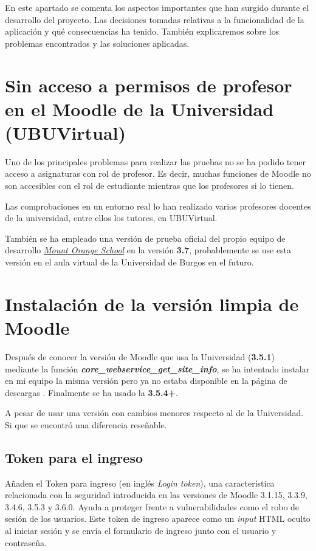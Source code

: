 
En este apartado se comenta los aspectos importantes que han surgido durante el desarrollo del proyecto. Las decisiones tomadas relativas a la funcionalidad de la aplicación y qué consecuencias ha tenido. También explicaremos sobre los problemas encontrados y las soluciones aplicadas.

\section{Sin acceso a permisos de profesor en el Moodle de la Universidad (UBUVirtual)}

Uno de los principales problemas para realizar las pruebas no se ha podido tener acceso a asignaturas con rol de profesor. Es decir, muchas funciones de Moodle no son accesibles con el rol de estudiante mientras que los profesores si lo tienen.

Las comprobaciones en un entorno real lo han realizado varios profesores docentes de la universidad, entre ellos los tutores, en UBUVirtual.

También se ha empleado una versión de prueba oficial del propio equipo de desarrollo \href{https://school.demo.moodle.net}{\textit{Mount Orange School}} en la versión \textbf{3.7}, probablemente se use esta versión en el aula virtual de la Universidad de Burgos en el futuro.

\section{Instalación de la versión limpia de Moodle}
Después de conocer la versión de Moodle que usa la Universidad (\textbf{3.5.1}) mediante  la función \textbf{\textit{core\_webservice\_get\_site\_info}}, se ha intentado instalar en mi equipo la misma versión pero ya no estaba disponible en la página de descargas \cite{noauthor_moodle_nodate}. Finalmente se ha usado la \textbf{3.5.4+}.

A pesar de usar una versión con cambios menores respecto al de la Universidad. Si que se encontró una diferencia reseñable. 

\subsection{Token para el ingreso}
Añaden el Token para ingreso\cite{noauthor_token_nodate} (en inglés \textit{Login token}), una característica relacionada con la seguridad introducida en las versiones de Moodle 3.1.15, 3.3.9, 3.4.6, 3.5.3 y 3.6.0. Ayuda a proteger frente a vulnerabilidades como el robo de sesión de los usuarios. Este token de ingreso aparece como un \textit{input} HTML oculto\cite{noauthor_html_nodate-1} al iniciar sesión y se envía el formulario de ingreso junto con el usuario y contraseña.

